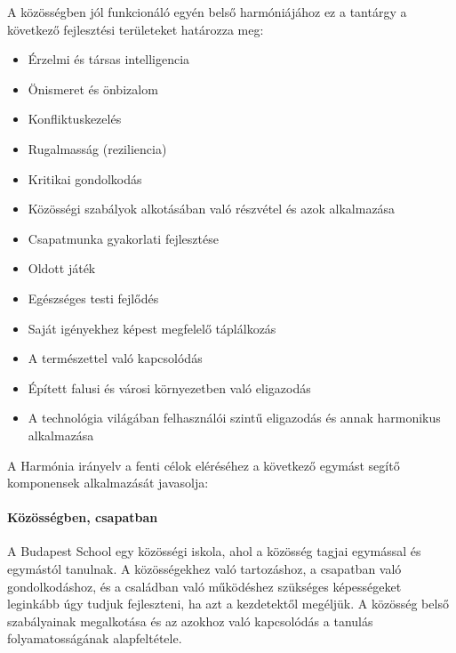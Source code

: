 A közösségben jól funkcionáló egyén belső harmóniájához ez a tantárgy a következő fejlesztési területeket határozza meg:
\begin{itemize}
  \item Érzelmi és társas intelligencia

  \item Önismeret és önbizalom

  \item Konfliktuskezelés

  \item Rugalmasság (reziliencia)

  \item Kritikai gondolkodás

  \item Közösségi szabályok alkotásában való részvétel és azok alkalmazása

  \item Csapatmunka gyakorlati fejlesztése

  \item Oldott játék

  \item Egészséges testi fejlődés

  \item Saját igényekhez képest megfelelő táplálkozás

  \item A természettel való kapcsolódás

  \item Épített falusi és városi környezetben való eligazodás

  \item A technológia világában felhasználói szintű eligazodás és
    annak\linebreak
    harmonikus alkalmazása
\end{itemize}

A Harmónia irányelv a fenti célok eléréséhez a következő egymást segítő komponensek alkalmazását javasolja:

\paragraph{Közösségben, csapatban}

A Budapest School egy közösségi iskola, ahol a közösség tagjai egymással és egymástól tanulnak. A közösségekhez való tartozáshoz, a csapatban való gondolkodáshoz, és a családban való működéshez szükséges képességeket leginkább úgy tudjuk fejleszteni, ha azt a kezdetektől megéljük. A közösség belső szabályainak megalkotása és az azokhoz való kapcsolódás a tanulás folyamatosságának alapfeltétele.

